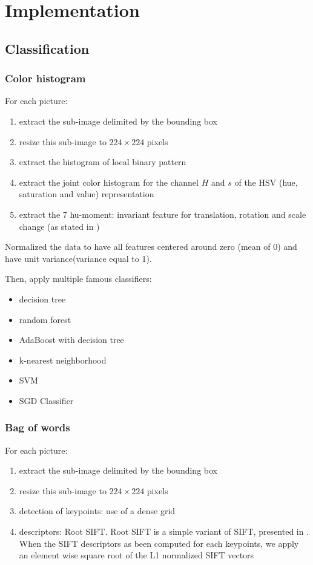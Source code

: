 \chapter{Implementation}
\section{Classification}
\subsection{Color histogram}

For each picture:
\begin{enumerate}
    \item extract the sub-image delimited by the bounding box
    \item resize this sub-image to $224 \times 224$ pixels
    \item extract the histogram of local binary pattern
    \item extract the joint color histogram for the channel $H$ and $s$ of the HSV (hue, saturation and value) representation
    \item extract the 7 hu-moment: invariant feature for translation, rotation and scale change (as stated in \cite{Hu1962})
\end{enumerate}

Normalized the data to have all features centered around zero (mean of 0) and have unit variance(variance equal to 1).

Then, apply multiple famous classifiers:
\begin{itemize}
    \item decision tree
    \item random forest
    \item AdaBoost with decision tree
    \item k-nearest neighborhood
    \item SVM
    \item SGD Classifier
\end{itemize}

\subsection{Bag of words}

For each picture:
\begin{enumerate}
    \item extract the sub-image delimited by the bounding box
    \item resize this sub-image to $224 \times 224$ pixels
    \item detection of keypoints: use of a dense grid
    \item descriptors: Root SIFT. Root SIFT is a simple variant of SIFT, presented in \cite{Arandjelovic2012}. When the SIFT descriptors as been computed for each keypoints, we apply an element wise square root of the L1 normalized SIFT vectors
\end{enumerate}

